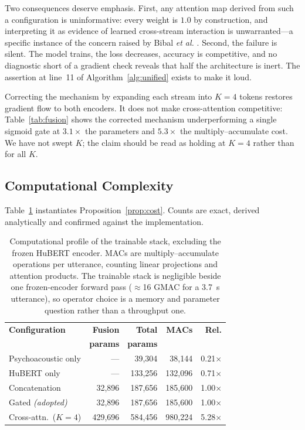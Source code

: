\documentclass[journal,onecolumn,11pt,draftclsnofoot]{IEEEtran}   %
\begin{document}
Two consequences deserve emphasis. First, any attention map derived from such a
configuration is uninformative: every weight is $1.0$ by construction, and
interpreting it as evidence of learned cross-stream interaction is
unwarranted---a specific instance of the concern raised by Bibal \emph{et al.}
\cite{bibal2022attention}. Second, the failure is silent. The model trains, the
loss decreases, accuracy is competitive, and no diagnostic short of a gradient
check reveals that half the architecture is inert. The assertion at line~11 of
Algorithm~\ref{alg:unified} exists to make it loud.

Correcting the mechanism by expanding each stream into $K = 4$ tokens restores
gradient flow to both encoders. It does not make cross-attention competitive:
Table~\ref{tab:fusion} shows the corrected mechanism underperforming a single
sigmoid gate at $3.1\times$ the parameters and $5.3\times$ the multiply--accumulate cost. We have not swept $K$; the claim should be read as holding at
$K=4$ rather than for all $K$.

\subsection{Computational Complexity}
\label{sec:complexity}
Table~\ref{tab:complexity} instantiates Proposition~\ref{prop:cost}. Counts are
exact, derived analytically and confirmed against the implementation.

\begin{table}[!t]
\centering\small
\setlength{\tabcolsep}{3pt}
\caption{Computational profile of the trainable stack, excluding the frozen
HuBERT encoder. MACs are multiply--accumulate operations per utterance, counting
linear projections and attention products. The trainable stack is negligible
beside one frozen-encoder forward pass ($\approx$16 GMAC for a 3.7~s utterance),
so operator choice is a memory and parameter question rather than a throughput
one.}
\label{tab:complexity}
\begin{tabular}{@{}lrrrr@{}}
\toprule
\textbf{Configuration} & \textbf{Fusion} & \textbf{Total} & \textbf{MACs} &
\textbf{Rel.} \\
 & \textbf{params} & \textbf{params} & & \\
\midrule
Psychoacoustic only    & ---      & 39{,}304  & 38{,}144  & 0.21$\times$ \\
HuBERT only            & ---      & 133{,}256 & 132{,}096 & 0.71$\times$ \\
Concatenation          & 32{,}896 & 187{,}656 & 185{,}600 & 1.00$\times$ \\
Gated \emph{(adopted)} & 32{,}896 & 187{,}656 & 185{,}600 & 1.00$\times$ \\
Cross-attn.\ ($K{=}4$) & 429{,}696 & 584{,}456 & 980{,}224 & 5.28$\times$ \\
\bottomrule
\end{tabular}
\end{table}
\end{document}
